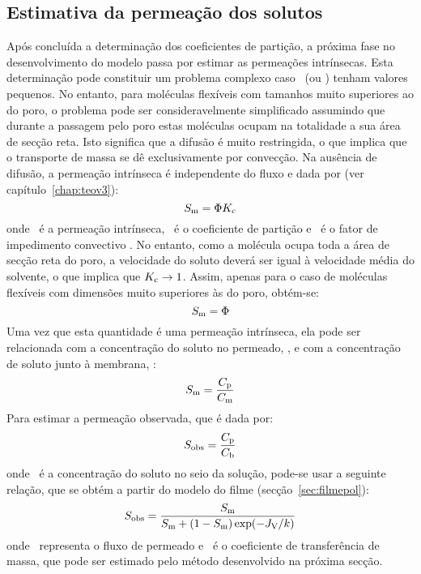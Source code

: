 \subsection{Estimativa da permeação dos solutos}
Após concluída a determinação dos coeficientes de partição, a próxima fase no desenvolvimento do modelo passa por estimar as permeações intrínsecas.
%
Esta determinação pode constituir um problema complexo caso \lambdas\ (ou \lambdah) tenham valores pequenos. No entanto, para moléculas flexíveis com tamanhos muito superiores ao do poro, o problema pode ser consideravelmente simplificado assumindo que durante a passagem pelo poro estas moléculas ocupam na totalidade a sua área de secção reta. Isto significa que a difusão é muito restringida, o que implica que o transporte de massa se dê exclusivamente por convecção. Na ausência de difusão, a permeação intrínseca é independente do fluxo e dada por (ver capítulo~\ref{chap:teov3}):
\begin{equation}
\label{eq:15art1}
S_{\mathrm{m}} = \Phi K_{\mathrm{c}}
\end{equation}%
%
onde \permm\ é a permeação intrínseca, \particao\ é o coeficiente de partição e \kapace\ é o fator de impedimento convectivo \cite{deen}. No entanto, como a molécula ocupa toda a área de secção reta do poro, a velocidade do soluto deverá ser igual à velocidade média do solvente, o que implica que $K_{\mathrm{c}}\rightarrow 1$. Assim, apenas para o caso de moléculas flexíveis com dimensões muito superiores às do poro, obtém-se:
\begin{equation}
\label{eq:17art1}
S_{\mathrm{m}} = \Phi
\end{equation}
Uma vez que esta quantidade é uma permeação intrínseca, ela pode ser relacionada com a concentração do soluto no permeado, \concp, e com a concentração de soluto junto à membrana, \concm:
%
%
\begin{equation}
\label{eq:18art1}
S_{\mathrm{m}}=\frac{C_{\mathrm{p}}}{C_{\mathrm{m}}}
\end{equation}
Para estimar a permeação observada, que é dada por:
%
\begin{equation}
\label{eq:19art1}
S_{\mathrm{obs}}=\frac{C_{\mathrm{p}}}{C_{\mathrm{b}}}
\end{equation}
onde \concb\ é a concentração do soluto no seio da solução, pode-se usar a seguinte relação, que se obtém a partir do modelo do filme \cite{sherwood} (secção~\ref{sec:filmepol}):
%
\begin{equation}
\label{eq:20art1}
S_{\mathrm{obs}}=\frac{S_{\mathrm{m}}}{S_{\mathrm{m}}+(1-S_{\mathrm{m}})\exp(-J_{\mathrm{V}}/k)}
\end{equation}
onde \fluxo\ representa o fluxo de permeado e \coeficientemassa\ é o coeficiente de transferência de massa, que pode ser estimado pelo método desenvolvido na próxima secção.
%
%

